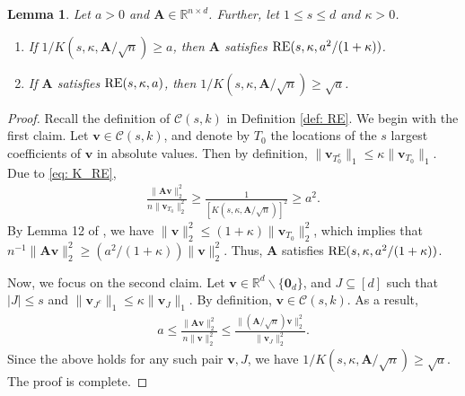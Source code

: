 \documentclass[aos,preprint]{imsart}
\theoremstyle{plain}
\newtheorem{lemma}[theorem]{Lemma}
\theoremstyle{definition}
\newtheorem{remark}{Remark}
\newcommand{\bd}[1]{\boldsymbol{#1}}
\newcommand{\mR}{\mathbb{R}}
\newcommand{\bA}{\boldsymbol{A}}
\newcommand{\bv}{\boldsymbol{v}}
\begin{document}
\begin{appendix}
\begin{lemma} \label{lemma: zhou lemma 12}
Let $a>0$ and $\bA\in \mR^{n\times d}$. Further, let  $1 \leq s \leq d$ and $\kappa > 0$.

\begin{enumerate}[label=\roman*)]
\item If 
$1/{K(s, \kappa, \bA/\sqrt{n})} \ge a$,
then $\bA$ satisfies $\textup{RE}(s,\kappa,a^2/(1+\kappa))$.

\item If $\bA$ satisfies $\textup{RE}(s,\kappa, a)$, then $1/{K(s, \kappa, \bA/\sqrt{n})} \ge \sqrt{a}$.
\end{enumerate}
\end{lemma}


\begin{proof}
Recall the definition of $\mathcal{C}(s,k)$ in Definition \ref{def: RE}. We begin with the first claim. Let $\bv \in \mathcal{C}(s,k)$, and denote by $T_0$ the locations of the $s$ largest coefficients of $\bv$ in absolute values. Then by definition, 
$\|\bv_{T_0^c}\|_1 \le \kappa \|\bv_{T_0}\|_1$. Due to \eqref{eq: K_RE}, 
\begin{align*}
   \frac{\|\bA \bv\|_2^2}{n\|\bv_{T_0}\|_2^2} \geq  \frac{1}{[K(s,\kappa,\bA/\sqrt{n})]^2}  \ge a^2. 
\end{align*}
By Lemma 12 of \cite{pmlr-v23-rudelson12}, we have 
$\|\bv\|_2^2 \leq (1+\kappa) \|\bv_{T_0}\|_2^2$, which implies that $n^{-1}\|\bA \bv\|_2^2 \geq (a^2/(1+\kappa)) \|\bv\|_2^2$. Thus, $\bA$ satisfies $\textup{RE}(s,\kappa,a^2/(1+\kappa))$.

Now, we focus on the second claim. Let $\bv \in\mR^d\backslash\{\bd{0}_d\}$, and $J \subseteq [d]$ such that $|J| \leq s$ and $\|\bv_{J^c}\|_1 \le \kappa\|\bv_J\|_1$. By definition, $\bv \in \mathcal{C}(s,k)$. As a result,
\begin{align*}
   a \leq  \frac{\|\bA \bv\|_2^2}{n\|\bv\|_2^2} \leq \frac{\|(\bA/\sqrt{n}) \bv\|_2^2}{\|\bv_J\|_2^2}.
\end{align*}
Since the above holds for any such pair $\bv,J$, we have $1/{K(s, \kappa, \bA/\sqrt{n})} \ge \sqrt{a}$. The proof is complete. 
\end{proof}


\end{appendix}
\end{document}
